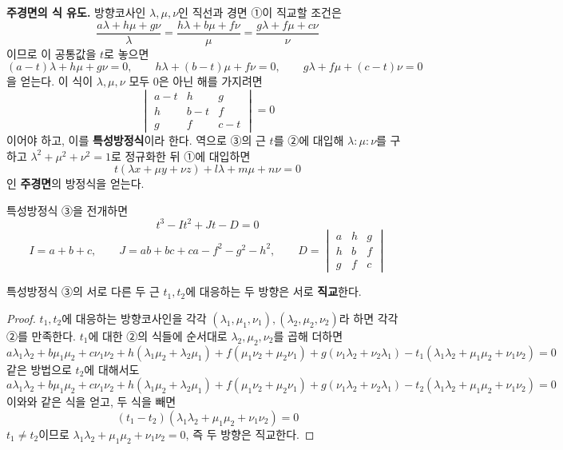 \documentclass{article}
\theoremstyle{mystyle}
\begin{document}
\textbf{주경면의 식 유도.} 방향코사인 \(\lambda,\mu,\nu\)인 직선과 경면 ①이 직교할 조건은
\[
\frac{a\lambda+h\mu+g\nu}{\lambda}=\frac{h\lambda+b\mu+f\nu}{\mu}=\frac{g\lambda+f\mu+c\nu}{\nu}
\]
이므로 이 공통값을 \(t\)로 놓으면
\[
(a-t)\lambda+h\mu+g\nu=0,\qquad h\lambda+(b-t)\mu+f\nu=0,\qquad g\lambda+f\mu+(c-t)\nu=0 \tag{②}
\]
을 얻는다. 이 식이 \(\lambda,\mu,\nu\) 모두 0은 아닌 해를 가지려면
\[
\begin{vmatrix} a-t & h & g\\ h & b-t & f\\ g & f & c-t \end{vmatrix}=0 \tag{③}
\]
이어야 하고, 이를 \textbf{특성방정식}이라 한다. 역으로 ③의 근 \(t\)를 ②에 대입해 \(\lambda:\mu:\nu\)를 구하고 \(\lambda^2+\mu^2+\nu^2=1\)로 정규화한 뒤 ①에 대입하면
\[
t(\lambda x+\mu y+\nu z)+l\lambda+m\mu+n\nu=0
\]
인 \textbf{주경면}의 방정식을 얻는다.

특성방정식 ③을 전개하면
\[
t^3-It^2+Jt-D=0 \tag{④}
\]
\[
I=a+b+c,\qquad J=ab+bc+ca-f^2-g^2-h^2,\qquad D=\begin{vmatrix} a&h&g\\ h&b&f\\ g&f&c \end{vmatrix}
\]

\begin{tcolorbox}[
    colback=red!4,
    colframe=red!60!black,
    title=정리 1,
    fonttitle=\bfseries,
    boxrule=0.5mm,
    arc=3mm
    ]
    특성방정식 ③의 서로 다른 두 근 \(t_1,t_2\)에 대응하는 두 방향은 서로 \textbf{직교}한다.
\end{tcolorbox}

\begin{proof}
\(t_1,t_2\)에 대응하는 방향코사인을 각각 \((\lambda_1,\mu_1,\nu_1),(\lambda_2,\mu_2,\nu_2)\)라 하면 각각 ②를 만족한다. \(t_1\)에 대한 ②의 식들에 순서대로 \(\lambda_2,\mu_2,\nu_2\)를 곱해 더하면
\[
a\lambda_1\lambda_2+b\mu_1\mu_2+c\nu_1\nu_2+h(\lambda_1\mu_2+\lambda_2\mu_1)+f(\mu_1\nu_2+\mu_2\nu_1)+g(\nu_1\lambda_2+\nu_2\lambda_1)-t_1(\lambda_1\lambda_2+\mu_1\mu_2+\nu_1\nu_2)=0
\]
같은 방법으로 \(t_2\)에 대해서도
\[
a\lambda_1\lambda_2+b\mu_1\mu_2+c\nu_1\nu_2+h(\lambda_1\mu_2+\lambda_2\mu_1)+f(\mu_1\nu_2+\mu_2\nu_1)+g(\nu_1\lambda_2+\nu_2\lambda_1)-t_2(\lambda_1\lambda_2+\mu_1\mu_2+\nu_1\nu_2)=0
\]
이와와 같은 식을 얻고, 두 식을 빼면
\[
(t_1-t_2)(\lambda_1\lambda_2+\mu_1\mu_2+\nu_1\nu_2)=0
\]
\(t_1\ne t_2\)이므로 \(\lambda_1\lambda_2+\mu_1\mu_2+\nu_1\nu_2=0\), 즉 두 방향은 직교한다.
\end{proof}
\end{document}
